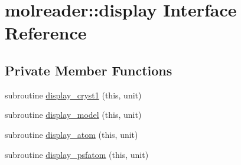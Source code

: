 \hypertarget{interfacemolreader_1_1display}{\section{molreader\-:\-:display Interface Reference}
\label{interfacemolreader_1_1display}
}
\subsection*{Private Member Functions}
\begin{DoxyCompactItemize}
\item 
subroutine \hyperlink{interfacemolreader_1_1display_a367a91877524a939c53cd58ce8ac0635}{display\-\_\-cryst1} (this, unit)
\item 
subroutine \hyperlink{interfacemolreader_1_1display_af76b8884f32bae6a2a70d92dea1e884d}{display\-\_\-model} (this, unit)
\item 
subroutine \hyperlink{interfacemolreader_1_1display_a9e155fe19986dcbbceeccb957eb9eedb}{display\-\_\-atom} (this, unit)
\item 
subroutine \hyperlink{interfacemolreader_1_1display_a0f0d826e10fcae2957860b21580f136a}{display\-\_\-psfatom} (this, unit)
\end{DoxyCompactItemize}


